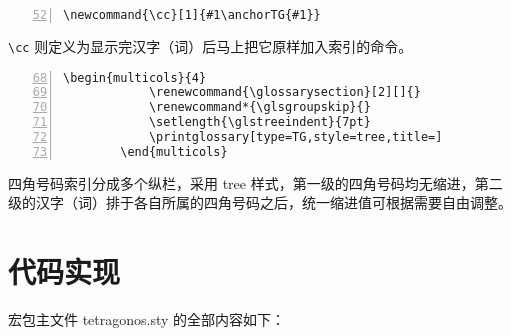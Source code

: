 \documentclass[a4paper]{ctexart}
\begin{document}
\begin{adjustwidth}{3em}{3em}
	\begin{Verbatim}[numbers=left,numbersep=1ex,gobble=2,firstnumber=52,formatcom=\color{darkmiku}]
		\newcommand{\cc}[1]{#1\anchorTG{#1}}
	\end{Verbatim}
	\verb|\cc| 则定义为显示完汉字（词）后马上把它原样加入索引的命令。
	\begin{Verbatim}[numbers=left,numbersep=1ex,gobble=2,firstnumber=68,tabsize=4,formatcom=\color{darkmiku}]
		\begin{multicols}{4}
			\renewcommand{\glossarysection}[2][]{}
			\renewcommand*{\glsgroupskip}{}
			\setlength{\glstreeindent}{7pt}
			\printglossary[type=TG,style=tree,title=]
		\end{multicols}
	\end{Verbatim}
	四角号码索引分成多个纵栏，采用 tree 样式，第一级的四角号码均无缩进，第二级的汉字（词）排于各自所属的四角号码之后，统一缩进值可根据需要自由调整。
	\end{adjustwidth}
\endgroup

\section{代码实现}

宏包主文件 tetragonos.sty 的全部内容如下：
\end{document}
